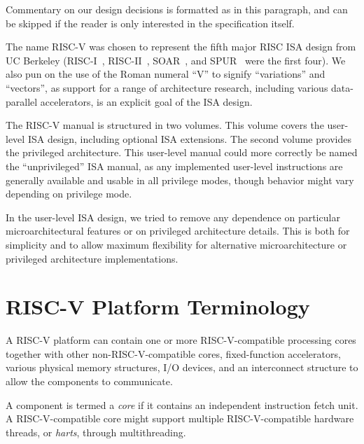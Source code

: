 \begin{commentary}
Commentary on our design decisions is formatted as in this paragraph,
and can be skipped if the reader is only interested in the
specification itself.
\end{commentary}
\begin{commentary}
The name RISC-V was chosen to represent the fifth major RISC ISA
design from UC Berkeley (RISC-I~\cite{riscI-isca1981},
RISC-II~\cite{Katevenis:1983}, SOAR~\cite{Ungar:1984}, and
SPUR~\cite{spur-jsscc1989} were the first four).  We also pun on the
use of the Roman numeral ``V'' to signify ``variations'' and
``vectors'', as support for a range of architecture research,
including various data-parallel accelerators, is an explicit goal of
the ISA design.
\end{commentary}

The RISC-V manual is structured in two volumes.  This volume covers
the user-level ISA design, including optional ISA extensions.  The
second volume provides the privileged architecture.  This user-level
manual could more correctly be named the ``unprivileged'' ISA manual,
as any implemented user-level instructions are generally available and
usable in all privilege modes, though behavior might vary depending on
privilege mode.

\begin{commentary}
In the user-level ISA design, we tried to remove any dependence on
particular microarchitectural features or on privileged architecture
details.  This is both for simplicity and to allow maximum flexibility
for alternative microarchitecture or privileged architecture
implementations.
\end{commentary}

\section{RISC-V Platform Terminology}

A RISC-V platform can contain one or more RISC-V-compatible
processing cores together with other non-RISC-V-compatible cores,
fixed-function accelerators, various physical memory structures, I/O
devices, and an interconnect structure to allow the components to
communicate.

A component is termed a {\em core} if it contains an independent
instruction fetch unit.  A RISC-V-compatible core might support
multiple RISC-V-compatible hardware threads, or {\em harts}, through
multithreading.

